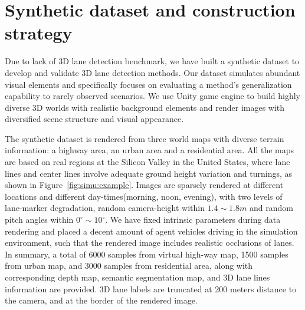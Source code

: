 \documentclass[10pt,twocolumn,letterpaper]{article}
\begin{document}
\begin{comment}
\begin{figure}[!h]
  \centering
  \texttt{[image: figs/00\_0000045.jpg]}
  \texttt{[image: figs/08\_0000003.jpg]}
\caption{\textbf{Examples of synthetic data.} Images are rendered from different terrain maps and with different day-times respectively. In each image, lane lines and center lines are drawn in green and blue separately. Those background-occluded segments of lanes in the distance (black) are discarded in a post-process.}
  \label{fig:simu:example}
\end{figure}
\end{comment}

\section{Synthetic dataset and construction strategy}
\label{sec:data}



Due to lack of 3D lane detection benchmark, we have built a synthetic dataset to develop and validate 3D lane detection methods. Our dataset simulates abundant visual elements and specifically focuses on evaluating a method's generalization capability to rarely observed scenarios. We use Unity game engine to build highly diverse 3D worlds with realistic background elements and render images with diversified scene structure and visual appearance.

The synthetic dataset is rendered from three world maps with diverse terrain information: a highway area, an urban area and a residential area. All the maps are based on real regions at the Silicon Valley in the United States, where lane lines and center lines involve adequate ground height variation and turnings, as shown in Figure~\ref{fig:simu:example}. Images are sparsely rendered at different locations and different day-times(morning, noon, evening), with two levels of lane-marker degradation, random camera-height within $1.4\sim1.8 m$ and random pitch angles within $0^\circ \sim  10^\circ$. We have fixed intrinsic parameters during data rendering and placed a decent amount of agent vehicles driving in the simulation environment, such that the rendered image includes realistic occlusions of lanes. In summary, a total of 6000 samples from virtual high-way map, 1500 samples from urban map, and 3000 samples from residential area, along with corresponding depth map, semantic segmentation map, and 3D lane lines information are provided. 3D lane labels are truncated at 200 meters distance to the camera, and at the border of the rendered image.
\end{document}

